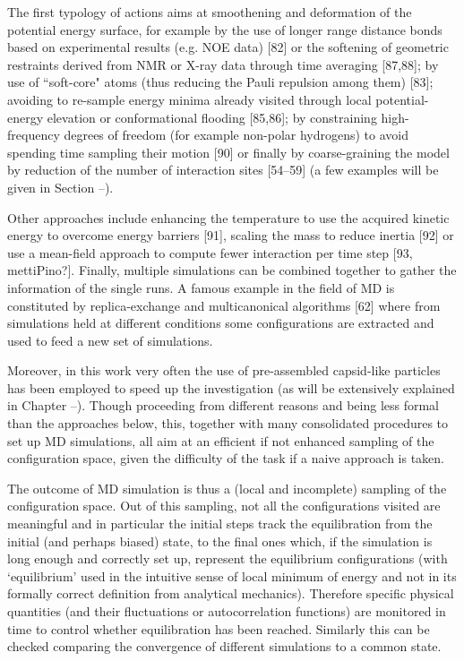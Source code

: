 The first typology of actions aims at smoothening and deformation of the potential energy surface, for example by the use of longer range distance bonds based on experimental results (e.g. NOE data) [82] or the softening of geometric restraints derived from NMR or X-ray data through time averaging [87,88]; by use of ``soft-core" atoms (thus reducing the Pauli repulsion among them) [83];
 avoiding to re-sample energy minima already visited through local potential-energy elevation or conformational flooding [85,86]; by constraining high-frequency degrees of freedom (for example non-polar hydrogens) to avoid spending time sampling their motion [90] or finally by coarse-graining the model by reduction of the number of interaction sites [54–59] (a few examples will be given in Section --).

Other approaches include enhancing the temperature to use the acquired kinetic energy to overcome energy barriers [91], scaling the mass to reduce inertia [92] or use a mean-field approach to compute fewer interaction per time step [93, mettiPino?].
%
Finally, multiple simulations can be combined together to gather the information of the single runs. A famous example in the field of MD is constituted by replica-exchange and multicanonical algorithms [62] where from simulations held at different conditions some configurations are extracted and used to feed a new set of simulations.

Moreover, in this work very often the use of pre-assembled capsid-like particles has been employed to speed up the investigation (as will be extensively explained in Chapter --). Though proceeding from different reasons and being less formal than the approaches below, this, together with many consolidated procedures to set up MD simulations, all aim at an efficient if not enhanced sampling of the configuration space, given the difficulty of the task if a naive approach is taken.

The outcome of MD simulation is thus a (local and incomplete) sampling of the configuration space. Out of this sampling, not all the configurations visited are meaningful and in particular the initial steps track the equilibration from the initial (and perhaps biased) state, to the final ones which, if the simulation is long enough and correctly set up, represent the equilibrium configurations (with `equilibrium' used in the intuitive sense of local minimum of energy and not in its formally correct definition from analytical mechanics). Therefore specific physical quantities (and their fluctuations or autocorrelation functions) are monitored in time to control whether equilibration has been reached. Similarly this can be checked comparing the convergence of different simulations to a common state.

